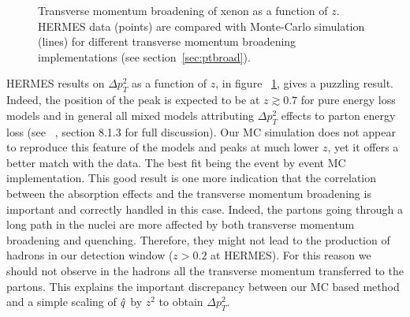 \begin{figure}[tbp]
  \centering
{}
\caption {Transverse momentum broadening of xenon as a function of $z$. HERMES 
data \cite{Airapetian:2009jy} (points) are compared with Monte-Carlo simulation 
(lines) for different transverse momentum broadening implementations (see 
section~\ref{sec:ptbroad}).}
\label{fig:PtC-Ptz}
\end{figure}

HERMES results on $\Delta p_T^2$ as a function of $z$, in figure~%
\ref{fig:PtC-Ptz}, gives a puzzling result. Indeed, the position of the peak is 
expected to be at $z\gtrsim 0.7$ for pure energy loss models and in general all 
mixed models attributing $\Delta p_T^2$ effects to parton energy loss (see~%
\cite{Accardi:2009qv}, section 8.1.3 for full discussion). Our MC simulation 
does not appear to reproduce this feature of the models and peaks at much lower 
$z$, yet it offers a better match with the data. The best fit being the event 
by event MC implementation. This good result is one more indication that the 
correlation between the absorption effects and the transverse momentum 
broadening is important and correctly handled in this case. Indeed, the partons 
going through a long path in the nuclei are more affected by both transverse 
momentum broadening and quenching. Therefore, they might not lead to the 
production of hadrons in our detection window ($z>0.2$ at HERMES). For this 
reason we should not observe in the hadrons all the transverse momentum 
transferred to the partons. This explains the important discrepancy between our 
MC based method and a simple scaling of ${\hat q}$ by $z^2$ to obtain $\Delta 
p_T^2$.


